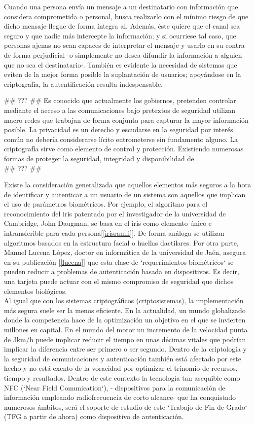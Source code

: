 \documentclass[PFC.tex]{subfiles}
\begin{document}
Cuando una persona envía un mensaje a un destinatario con información que considera comprometida o personal, busca realizarlo con el mínimo riesgo de que dicho mensaje llegue de forma íntegra al. Además, éste quiere que el canal sea seguro y que nadie más intercepte la información; y si ocurriese tal caso, que personas ajenas no sean capaces de interpretar el mensaje y usarlo en su contra de forma perjudicial -o simplemente no desea difundir la información a alguien que no sea el destinatario-. También es evidente la necesidad de sistemas que eviten de la mejor forma posible la suplantación de usuarios; apoyándose en la criptografía, la autentificación resulta indespensable.


## ??? ##
Es conocido que actualmente los gobiernos, pretenden controlar mediante el acceso a las comunicaciones bajo pretextos de seguridad utilizan macro-redes que trabajan de forma conjunta para capturar la mayor información posible.  La privacidad es un derecho y escudarse en la seguridad por interés común no debería considerarse lícito entrometerse sin fundamento alguno. La criptografía sirve como elemento de control y protección. Existiendo numerosas formas de proteger la seguridad, integridad y disponibilidad de \\
## ??? ##

Existe la consideración generalizada que aquellos elementos más seguros a la hora de identificar y autenticar a un usuario de un sistema son aquellos que implican el uso de parámetros biométricos. Por ejemplo, el algoritmo para el reconocimiento del iris patentado por el investigador de la universidad de Cambridge, John Daugman, se basa en el iris como elemento único e intransferible para cada persona[\ref{irisramli}]. De forma análoga se utilizan algoritmos basados en la estructura facial o huellas dactilares. Por otra parte, Manuel Lucena López, doctor en informática de la universidad de Jaén, asegura en su publicación [\ref{lucena}] que esta clase de `requerimientos biométricos` se pueden reducir a problemas de autenticación basada en dispositivos. Es decir, una tarjeta puede actuar con el mismo compromiso de seguridad que dichos elementos biológicos.\\

Al igual que con los sistemas criptográficos (criptosistemas), la implementación más segura suele ser la menos eficiente. En la actualidad, un mundo globalizado donde la competencia  hace de la optimización un objetivo en el que se invierten millones en capital. En el mundo del motor un incremento de la velocidad punta de 3km/h puede implicar reducir el tiempo en unas décimas vitales que podrían implicar la diferencia entre ser primero o ser segundo. Dentro de la criptología y la seguridad de comunicaciones y autenticación también está afectado por este hecho y no está exento de la voracidad por optimizar el trinomio de recursos, tiempo y resultados. Dentro de este contexto la tecnología tan asequible como NFC (`Near Field Comunication`), - dispositivos para la comunicación de información empleando radiofrecuencia de corto alcance- que ha conquistado numerosos ámbitos, será el soporte de estudio de este `Trabajo de Fin de Grado` (TFG a partir de ahora) como dispositivo de autenticación.\\
\end{document}
